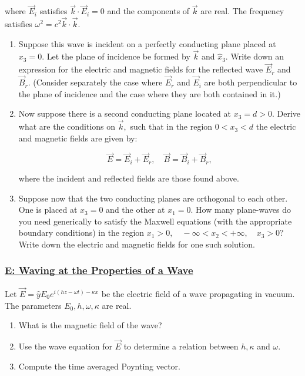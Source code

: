 where $\vec{E}_{i}$ satisfies $\vec{k} \cdot \vec{E}_{i}=0$ and the components of $\vec{k}$ are real. The frequency satisfies $\omega^{2}=c^{2} \vec{k} \cdot \vec{k}$.

\begin{enumerate}
	\item Suppose this wave is incident on a perfectly conducting plane placed at $x_{3}=0 .$ Let the plane of incidence be formed by $\vec{k}$ and $\hat{x}_{3} .$ Write down an expression for the electric and magnetic fields for the reflected wave $\vec{E}_{r}$ and $\vec{B}_{r} .$ (Consider separately the case where $\vec{E}_{r}$ and $\vec{E}_{i}$ are both perpendicular to the plane of incidence and the case where they are both contained in it.)
	\item Now suppose there is a second conducting plane located at $x_{3}=d>0$. Derive what are the conditions on $\vec{k},$ such that in the region $0<x_{3}<d$ the electric and magnetic fields are given by:
	
	\begin{equation}
		\vec{E}=\vec{E}_{i}+\vec{E}_{r}, \quad \vec{B}=\vec{B}_{i}+\vec{B}_{r},
	\end{equation}

	where the incident and reflected fields are those found above.
	\item Suppose now that the two conducting planes are orthogonal to each other. One is placed at $x_{3}=0$ and the other at $x_{1}=0 .$ How many plane-waves do you need generically to satisfy the Maxwell equations (with the appropriate boundary conditions) in the region $x_{1}>0, \quad-\infty<x_{2}<+\infty, \quad x_{3}>0 $? Write down the electric and magnetic fields for one such solution.
\end{enumerate}


\subsubsection{\hyperref[E: Waving at the Properties of a Wave]{E: Waving at the Properties of a Wave}}

Let $\vec{E}=\hat{y} E_{0} e^{i(h z-\omega t)-\kappa x}$ be the electric field of a wave propagating in vacuum. The parameters $E_{0}, h, \omega, \kappa$ are real.

\begin{enumerate}
	\item What is the magnetic field of the wave?
	\item Use the wave equation for $\vec{E}$ to determine a relation between $h, \kappa$ and $\omega$.
	\item Compute the time averaged Poynting vector.	
\end{enumerate}
